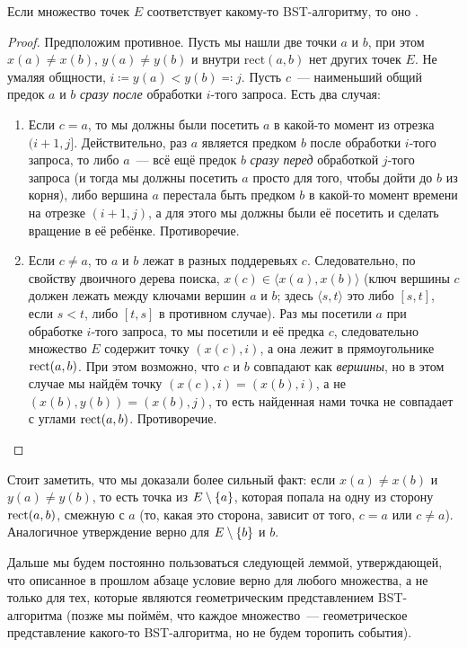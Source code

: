 \begin{theorem}\label{bst_to_arbs} Если множество точек $E$ соответствует какому-то BST-алгоритму,
	то оно \arbs.
\end{theorem}
\begin{proof} Предположим противное. Пусть мы нашли две точки $a$ и $b$, при этом
	$x(a) \neq x(b)$, $y(a) \neq y(b)$ и внутри $\mathrm{rect}(a, b)$ нет других точек $E$.
	Не умаляя общности, $i \coloneqq y(a) < y(b)\eqqcolon j$. Пусть $c$~--- наименьший общий предок $a$ и $b$ \emph{сразу после} обработки $i$-того запроса.
	Есть два случая:
	\begin{enumerate}
		\item Если $c = a$, то мы должны были посетить $a$ в какой-то момент из отрезка $(i + 1, j]$. Действительно, раз $a$ является предком $b$ после обработки $i$-того запроса, то либо $a$~--- всё ещё предок $b$ \emph{сразу перед} обработкой $j$-того запроса (и тогда мы должны посетить $a$ просто для того, чтобы дойти до $b$ из корня), либо вершина $a$ перестала быть предком $b$ в какой-то момент времени на отрезке $(i + 1, j)$, а для этого мы должны были её посетить и сделать вращение в её ребёнке. Противоречие.

		\item Если $c \neq a$, то $a$ и $b$ лежат в разных поддеревьях $c$. Следовательно, по свойству двоичного дерева поиска, $x(c) \in \langle x(a), x(b) \rangle$ (ключ вершины $c$ должен лежать между ключами вершин $a$ и $b$; здесь $\langle s, t \rangle$ это либо $[s, t]$, если $s < t$, либо $[t, s]$ в противном случае). Раз мы посетили $a$ при обработке $i$-того
		      запроса, то мы посетили и её предка $c$, следовательно множество $E$ содержит точку $(x(c), i)$, а она лежит в прямоугольнике $\operatorname{rect}(a, b)$. При этом возможно, что $c$ и $b$ совпадают как \emph{вершины}, но в этом случае мы найдём точку $(x(c), i) = (x(b), i)$, а не $(x(b), y(b)) = (x(b), j)$, то есть найденная нами точка не совпадает с углами $\operatorname{rect}(a, b)$. Противоречие.
	\end{enumerate}
\end{proof}

Стоит заметить, что мы доказали более сильный факт: если $x(a) \neq x(b)$ и $y(a) \neq y(b)$, то есть точка из $E \setminus \lbrace a\rbrace$, которая попала на одну из сторону $\operatorname{rect}(a, b)$, смежную с $a$ (то, какая это сторона, зависит от того, $c = a$ или $c \neq a$). Аналогичное утверждение верно для $E \setminus \lbrace b\rbrace$ и $b$.

Дальше мы будем постоянно пользоваться следующей леммой, утверждающей, что описанное в прошлом абзаце условие верно для любого \arbs множества, а не только для тех, которые
являются геометрическим представлением BST-алгоритма (позже мы поймём, что каждое
\arbs множество~--- геометрическое представление какого-то BST-алгоритма, но не будем торопить события).


